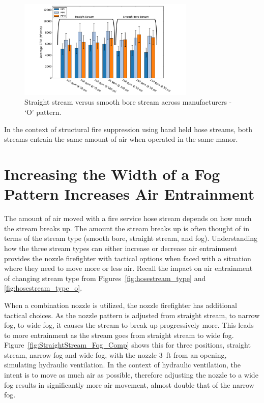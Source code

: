 \documentclass[12pt,oneside]{book}
\begin{document}
\begin{figure}[H]
\centering
\includegraphics[width=0.75\textwidth]{Figures/Air_Entrainment/SB_SS_All_O_Manufacture.pdf}
\caption[Straight Stream vs. Smooth Bore Stream Across Manufacturers - `O' Pattern]{Straight stream versus smooth bore stream across manufacturers - `O' pattern.}
\label{fig:SS_vs_SB_O}
\end{figure}

In the context of structural fire suppression using hand held hose streams, both streams entrain the same amount of air when operated in the same manor. 

\section{Increasing the Width of a Fog Pattern Increases Air Entrainment}
The amount of air moved with a fire service hose stream depends on how much the stream breaks up. The amount the stream breaks up is often thought of in terms of the stream type (smooth bore, straight stream, and fog). Understanding how the three stream types can either increase or decrease air entrainment provides the nozzle firefighter with tactical options when faced with a situation where they need to move more or less air. Recall the impact on air entrainment of changing stream type from Figures~\ref{fig:hosestream_type} and \ref{fig:hosestream_type_o}.

When a combination nozzle is utilized, the nozzle firefighter has additional tactical choices. As the nozzle pattern is adjusted from straight stream, to narrow fog, to wide fog, it causes the stream to break up progressively more. This leads to more entrainment as the stream goes from straight stream to wide fog. Figure~\ref{fig:StraightStream_Fog_Comp} shows this for three positions, straight stream, narrow fog and wide fog, with the nozzle 3~ft from an opening, simulating hydraulic ventilation. In the context of hydraulic ventilation, the intent is to move as much air as possible, therefore adjusting the nozzle to a wide fog results in significantly more air movement, almost double that of the narrow fog.  
\end{document}
